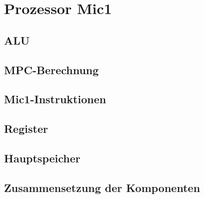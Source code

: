\chapter{Prozessor Mic1}
\section{ALU}
\section{MPC-Berechnung}
\section{Mic1-Instruktionen}
\section{Register}
\section{Hauptspeicher}
\section{Zusammensetzung der Komponenten}